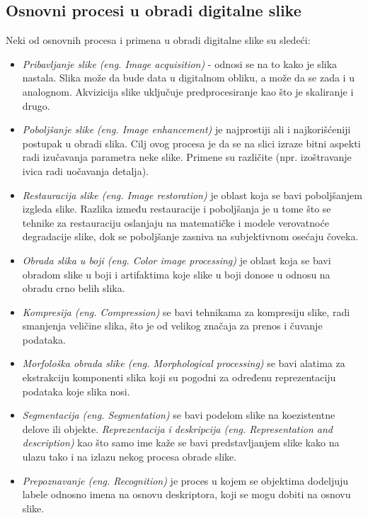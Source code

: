 \documentclass[a4paper,12pt,titlepage]{article}
\begin{document}
\subsection{Osnovni procesi u obradi digitalne slike}%

Neki od osnovnih procesa i primena u obradi digitalne slike su sledeći:
\begin{itemize}
\item \emph{Pribavljanje slike} \emph{(eng. Image acquisition)} - odnosi se na to kako je slika nastala. Slika može da bude data u digitalnom obliku, a može da se zada i u analognom. Akvizicija slike uključuje predprocesiranje kao što je skaliranje i drugo.
\item \emph{Poboljšanje slike} \emph{(eng. Image enhancement)} je najprostiji ali i najkorišćeniji postupak u obradi slika. Cilj ovog procesa je da se na slici izraze bitni aspekti radi izučavanja parametra neke slike. Primene su različite (npr. izoštravanje ivica radi uočavanja detalja).
\item \emph{Restauracija slike (eng. Image restoration)} je oblast koja se bavi poboljšanjem izgleda slike. Razlika između restauracije i poboljšanja je u tome što se tehnike za restauraciju oslanjaju na matematičke i modele verovatnoće degradacije slike, dok se poboljšanje zasniva na subjektivnom osećaju čoveka. 
\item \emph{Obrada slika u boji (eng. Color image processing)} je oblast koja se bavi obradom slike u boji i artifaktima koje slike u boji donose u odnosu na obradu crno belih slika. 
\item \emph{Kompresija (eng. Compression)} se bavi tehnikama za kompresiju slike, radi smanjenja veličine slika, što je od velikog značaja za prenos i čuvanje podataka. 
\item \emph{Morfološka obrada slike (eng. Morphological processing)} se bavi alatima za ekstrakciju komponenti slika koji su pogodni za određenu reprezentaciju podataka koje slika nosi.
\item  \emph{Segmentacija (eng. Segmentation)} se bavi podelom slike na koezistentne delove ili objekte. \emph{Reprezentacija i deskripcija (eng. Representation and description)} kao što samo ime kaže se bavi predstavljanjem slike kako na ulazu tako i na izlazu nekog procesa obrade slike. 
\item  \emph{Prepoznavanje (eng. Recognition)} je proces u kojem se objektima dodeljuju labele odnosno imena na osnovu deskriptora, koji se mogu dobiti na osnovu slike. 
\end{itemize}
\end{document}
